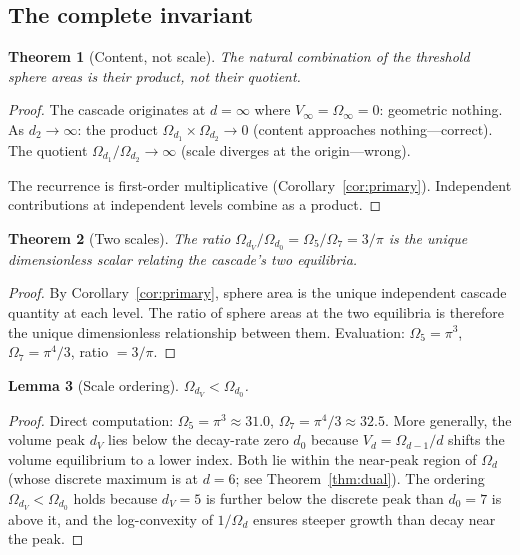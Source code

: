 \documentclass[11pt,a4paper]{article}
\newtheorem{theorem}{Theorem}[section]
\newtheorem{lemma}[theorem]{Lemma}
\begin{document}
\subsection{The complete invariant}

\begin{theorem}[Content, not scale]\label{thm:content}
The natural combination of the threshold sphere areas is their product,
not their quotient.
\end{theorem}

\begin{proof}
The cascade originates at $d = \infty$ where
$V_\infty = \Omega_\infty = 0$: geometric nothing. As
$d_2\to\infty$: the product $\Omega_{d_1}\times\Omega_{d_2}\to 0$
(content approaches nothing---correct). The quotient
$\Omega_{d_1}/\Omega_{d_2}\to\infty$ (scale diverges at the origin---wrong).

The recurrence is first-order multiplicative
(Corollary~\ref{cor:primary}). Independent contributions at independent
levels combine as a product.
\end{proof}

\begin{theorem}[Two scales]\label{thm:twoscales}
The ratio $\Omega_{d_V}/\Omega_{d_0} = \Omega_5/\Omega_7 = 3/\pi$ is the
unique dimensionless scalar relating the cascade's two equilibria.
\end{theorem}

\begin{proof}
By Corollary~\ref{cor:primary}, sphere area is the unique independent
cascade quantity at each level. The ratio of sphere areas at the two
equilibria is therefore the unique dimensionless relationship between them.
Evaluation:
$\Omega_5 = \pi^3$,\;
$\Omega_7 = \pi^4/3$,\;
ratio $= 3/\pi$.
\end{proof}

\begin{lemma}[Scale ordering]\label{lem:ordering}
$\Omega_{d_V} < \Omega_{d_0}$.
\end{lemma}

\begin{proof}
Direct computation: $\Omega_5 = \pi^3\approx 31.0$,\;
$\Omega_7 = \pi^4/3\approx 32.5$.
More generally, the volume peak $d_V$ lies below the decay-rate zero
$d_0$ because $V_d = \Omega_{d-1}/d$ shifts the volume equilibrium to a
lower index. Both lie within the near-peak region of $\Omega_d$
(whose discrete maximum is at $d = 6$; see Theorem~\ref{thm:dual}).
The ordering $\Omega_{d_V} < \Omega_{d_0}$ holds because $d_V = 5$
is further below the discrete peak than $d_0 = 7$ is above it, and
the log-convexity of $1/\Omega_d$ ensures steeper growth than decay
near the peak.
\end{proof}
\end{document}
